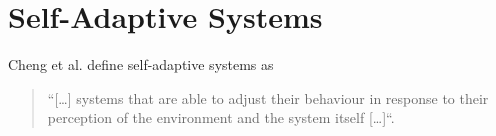 

    \section{Self-Adaptive Systems}
    \label{sec:self-adaptive}
    
    Cheng et al. define self-adaptive systems as
    \begin{quotation}
        ``[\ldots] systems that are able to adjust their behaviour in response to their perception of the environment and the
        system itself [\ldots]``\cite[p. 1]{Cheng:2009:SES:1573856.1573858}.
    \end{quotation}
    
